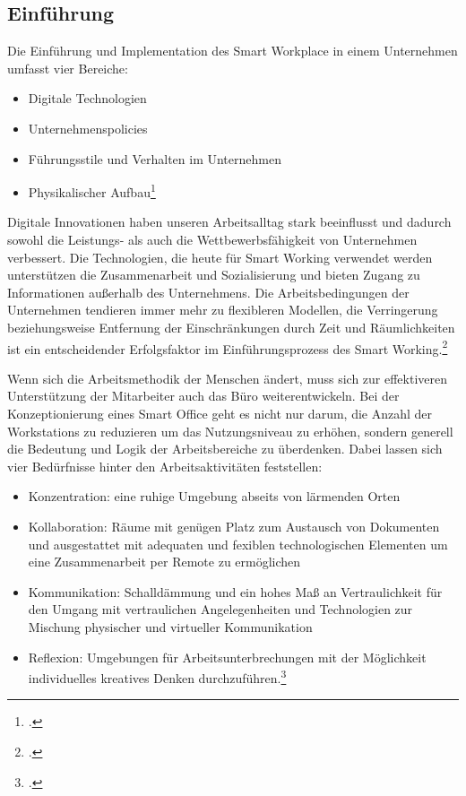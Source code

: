 \subsection{Einführung}
Die Einführung und Implementation des Smart Workplace in einem Unternehmen umfasst vier Bereiche:

\begin{itemize}
\item[1.] Digitale Technologien
\item[2.] Unternehmenspolicies
\item[3.] Führungsstile und Verhalten im Unternehmen
\item[4.] Physikalischer Aufbau\footcite[Vgl.][]{efm}
\end{itemize}

Digitale Innovationen haben unseren Arbeitsalltag stark beeinflusst und dadurch sowohl die Leistungs- als auch die Wettbewerbsfähigkeit von Unternehmen verbessert. Die Technologien, die heute für Smart Working verwendet werden unterstützen die Zusammenarbeit und Sozialisierung und bieten Zugang zu Informationen außerhalb des Unternehmens. Die Arbeitsbedingungen der Unternehmen tendieren immer mehr zu flexibleren Modellen, die Verringerung beziehungsweise Entfernung der Einschränkungen durch Zeit und Räumlichkeiten ist ein entscheidender Erfolgsfaktor im Einführungsprozess des Smart Working.\footcite[Vgl.][]{efm}

Wenn sich die Arbeitsmethodik der Menschen ändert, muss sich zur effektiveren Unterstützung der Mitarbeiter auch das Büro weiterentwickeln. Bei der Konzeptionierung eines Smart Office geht es nicht nur darum, die Anzahl der Workstations zu reduzieren um das Nutzungsniveau zu erhöhen, sondern generell die Bedeutung und Logik der Arbeitsbereiche zu überdenken. Dabei lassen sich vier Bedürfnisse hinter den Arbeitsaktivitäten feststellen:

\begin{itemize}
\item Konzentration: eine ruhige Umgebung abseits von lärmenden Orten
\item Kollaboration: Räume mit genügen Platz zum Austausch von Dokumenten und ausgestattet mit adequaten und fexiblen technologischen Elementen um eine  Zusammenarbeit per Remote zu ermöglichen
\item Kommunikation: Schalldämmung und ein hohes Maß an Vertraulichkeit für den Umgang mit vertraulichen Angelegenheiten und Technologien zur Mischung physischer und virtueller Kommunikation
\item Reflexion: Umgebungen für Arbeitsunterbrechungen mit der Möglichkeit individuelles kreatives Denken durchzuführen.\footcite[Vgl.][]{efm}
\end{itemize}

